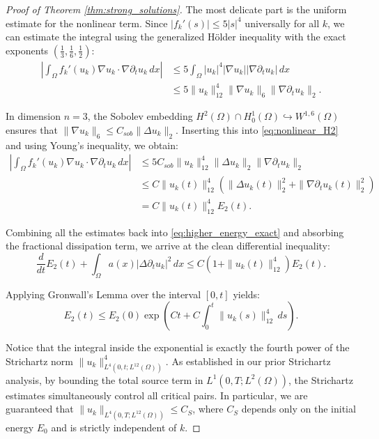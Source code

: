 \documentclass[11pt,letterpaper]{amsart}
\begin{document}
\begin{proof}[Proof of Theorem \ref{thm:strong_solutions}]
The most delicate part is the uniform estimate for the nonlinear term. Since $|f_k'(s)| \le 5|s|^4$ universally for all $k$, we can estimate the integral using the generalized Hölder inequality with the exact exponents $(\frac{1}{3}, \frac{1}{6}, \frac{1}{2})$:
\begin{align}\label{eq:nonlinear_H2}
    \left| \int_\Omega f_k'(u_k)\nabla u_k \cdot \nabla \partial_t u_k \,dx \right| &\le 5 \int_\Omega |u_k|^4 |\nabla u_k| |\nabla \partial_t u_k| \,dx \nonumber \\
    &\le 5 \|u_k\|_{12}^4 \|\nabla u_k\|_6 \|\nabla \partial_t u_k\|_2.
\end{align}

In dimension $n=3$, the Sobolev embedding $H^2(\Omega) \cap H_0^1(\Omega) \hookrightarrow W^{1,6}(\Omega)$ ensures that $\|\nabla u_k\|_6 \le C_{sob} \|\Delta u_k\|_2$. Inserting this into \eqref{eq:nonlinear_H2} and using Young's inequality, we obtain:
\begin{align}
    \left| \int_\Omega f_k'(u_k)\nabla u_k \cdot \nabla \partial_t u_k \,dx \right| &\le 5 C_{sob} \|u_k\|_{12}^4 \|\Delta u_k\|_2 \|\nabla \partial_t u_k\|_2 \nonumber \\
    &\le C \|u_k(t)\|_{12}^4 \left( \|\Delta u_k(t)\|_2^2 + \|\nabla \partial_t u_k(t)\|_2^2 \right) \nonumber \\
    &= C \|u_k(t)\|_{12}^4 E_2(t).
\end{align}

Combining all the estimates back into \eqref{eq:higher_energy_exact} and absorbing the fractional dissipation term, we arrive at the clean differential inequality:
\begin{equation}
    \frac{d}{dt} E_2(t) + \int_\Omega a(x)|\Delta \partial_t u_k|^2 \,dx \le C \left( 1 + \|u_k(t)\|_{12}^4 \right) E_2(t).
\end{equation}

Applying Gronwall's Lemma over the interval $[0, t]$ yields:
\begin{equation}\label{eq:gronwall_H2}
    E_2(t) \le E_2(0) \exp\left( C t + C \int_0^t \|u_k(s)\|_{12}^4 \,ds \right).
\end{equation}

Notice that the integral inside the exponential is exactly the fourth power of the Strichartz norm $\|u_k\|_{L^4(0,t; L^{12}(\Omega))}^4$. As established in our prior Strichartz analysis, by bounding the total source term in $L^1(0,T; L^2(\Omega))$, the Strichartz estimates simultaneously control all critical pairs. In particular, we are guaranteed that $\|u_k\|_{L^4(0,T; L^{12}(\Omega))} \le C_{S}$, where $C_{S}$ depends only on the initial energy $E_0$ and is strictly independent of $k$.


\end{proof}
\end{document}
